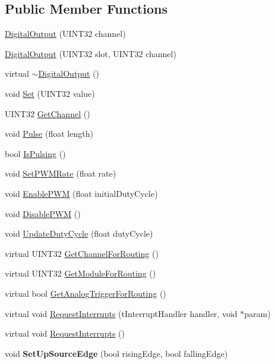 \subsection*{\-Public \-Member \-Functions}
\begin{DoxyCompactItemize}
\item 
\hyperlink{classDigitalOutput_ac1c585e61a1a1ae2c79845063b596725}{\-Digital\-Output} (\-U\-I\-N\-T32 channel)
\item 
\hyperlink{classDigitalOutput_af1649cff7e0d1f0c6195df263fba5c06}{\-Digital\-Output} (\-U\-I\-N\-T32 slot, \-U\-I\-N\-T32 channel)
\item 
virtual \hyperlink{classDigitalOutput_a442e379ebfbd2939d568809dad9c0ba2}{$\sim$\-Digital\-Output} ()
\item 
void \hyperlink{classDigitalOutput_af818325de1365e6b3902e64d7e902d72}{\-Set} (\-U\-I\-N\-T32 value)
\item 
\-U\-I\-N\-T32 \hyperlink{classDigitalOutput_a96c2d7c066de133bc4353251ddbbebf5}{\-Get\-Channel} ()
\item 
void \hyperlink{classDigitalOutput_a02c70b0de12b60f4d931cdc59e5e3bed}{\-Pulse} (float length)
\item 
bool \hyperlink{classDigitalOutput_ae7eeb94537b4b75891c9b93f380cc60d}{\-Is\-Pulsing} ()
\item 
void \hyperlink{classDigitalOutput_ad02dd24082f2b19215ee3dba04e54cd9}{\-Set\-P\-W\-M\-Rate} (float rate)
\item 
void \hyperlink{classDigitalOutput_a89d710e1c8968f956bafe63321728741}{\-Enable\-P\-W\-M} (float initial\-Duty\-Cycle)
\item 
void \hyperlink{classDigitalOutput_aa50319d3ffed532b1adc2243e7d2cdea}{\-Disable\-P\-W\-M} ()
\item 
void \hyperlink{classDigitalOutput_a21ce143ed578be81d04d66c0f5ef1800}{\-Update\-Duty\-Cycle} (float duty\-Cycle)
\item 
virtual \-U\-I\-N\-T32 \hyperlink{classDigitalOutput_a51540582af4f1ebb04c19e0256e0cbfd}{\-Get\-Channel\-For\-Routing} ()
\item 
virtual \-U\-I\-N\-T32 \hyperlink{classDigitalOutput_aa32b0d9370a8dca3970a09b38d0bb434}{\-Get\-Module\-For\-Routing} ()
\item 
virtual bool \hyperlink{classDigitalOutput_a5385027e23524f1872c5a091a2b98501}{\-Get\-Analog\-Trigger\-For\-Routing} ()
\item 
virtual void \hyperlink{classDigitalOutput_a7b6b75adbb177a08519ab3928f6ff625}{\-Request\-Interrupts} (t\-Interrupt\-Handler handler, void $\ast$param)
\item 
virtual void \hyperlink{classDigitalOutput_a8e0e5a3de7d43097e99f6ea885f43ece}{\-Request\-Interrupts} ()
\item 
\hypertarget{classDigitalOutput_a1aeededcacfa0d99f29b72bfaed873f3}{void {\bfseries \-Set\-Up\-Source\-Edge} (bool rising\-Edge, bool falling\-Edge)}\label{classDigitalOutput_a1aeededcacfa0d99f29b72bfaed873f3}

\end{DoxyCompactItemize}


